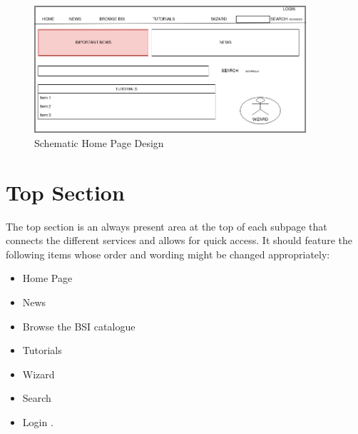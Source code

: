 \begin{figure}[h]
    \centering
    \includegraphics[width=0.9\textwidth]{Pictures/frontpage_mockup}
    \caption{Schematic Home Page Design}
\end{figure}
 
\section{Top Section} 
\label{top_section}

The top section is an always present area at the top of each subpage that connects the different services and allows for quick access.
It should feature the following items whose order and wording might be changed appropriately:
\begin{itemize}
    \item Home Page
    \item News
    \item Browse the BSI catalogue
    \item Tutorials
    \item Wizard
    \item Search
    \item Login  
        . 
\end{itemize}



